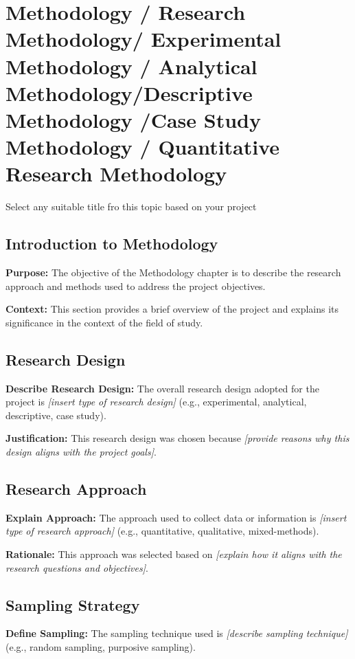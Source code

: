 \chapter{Methodology / Research Methodology/ Experimental Methodology / Analytical Methodology/Descriptive Methodology /Case Study Methodology  / Quantitative Research Methodology}


Select any suitable title fro this topic based on your project
	
	\section{Introduction to Methodology}
	\textbf{Purpose:} The objective of the Methodology chapter is to describe the research approach and methods used to address the project objectives.
	
	\textbf{Context:} This section provides a brief overview of the project and explains its significance in the context of the field of study.
	
	\section{Research Design}
	\textbf{Describe Research Design:} The overall research design adopted for the project is \textit{[insert type of research design]} (e.g., experimental, analytical, descriptive, case study).
	
	\textbf{Justification:} This research design was chosen because \textit{[provide reasons why this design aligns with the project goals]}.
	
	\section{Research Approach}
	\textbf{Explain Approach:} The approach used to collect data or information is \textit{[insert type of research approach]} (e.g., quantitative, qualitative, mixed-methods).
	
	\textbf{Rationale:} This approach was selected based on \textit{[explain how it aligns with the research questions and objectives]}.
	
	\section{Sampling Strategy}
	\textbf{Define Sampling:} The sampling technique used is \textit{[describe sampling technique]} (e.g., random sampling, purposive sampling).
	
